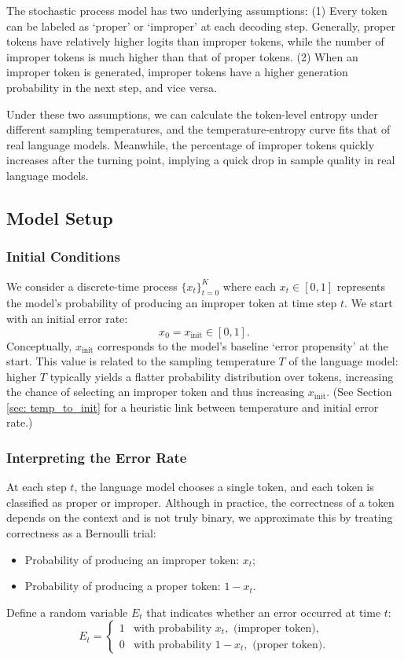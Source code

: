 The stochastic process model has two underlying assumptions: (1) Every token can be labeled as `proper' or `improper' at each decoding step. Generally, proper tokens have relatively higher logits than improper tokens, while the number of improper tokens is much higher than that of proper tokens. (2) When an improper token is generated, improper tokens have a higher generation probability in the next step, and vice versa.

Under these two assumptions, we can calculate the token-level entropy under different sampling temperatures, and the temperature-entropy curve fits that of real language models. Meanwhile, the percentage of improper tokens quickly increases after the turning point, implying a quick drop in sample quality in real language models.

\subsection{Model Setup}
\subsubsection{Initial Conditions}
We consider a discrete-time process \(\{x_t\}_{t=0}^{K}\) where each \(x_t \in [0,1]\) represents the model’s probability of producing an improper token at time step \(t\). We start with an initial error rate:
\[
x_0 = x_{\text{init}} \in [0,1].
\]
Conceptually, \(x_{\text{init}}\) corresponds to the model’s baseline `error propensity' at the start. This value is related to the sampling temperature \(T\) of the language model: higher \(T\) typically yields a flatter probability distribution over tokens, increasing the chance of selecting an improper token and thus increasing \(x_{\text{init}}\). (See Section \ref{sec: temp_to_init} for a heuristic link between temperature and initial error rate.)

\subsubsection{Interpreting the Error Rate}
At each step \(t\), the language model chooses a single token, and each token is classified as proper or improper. Although in practice, the correctness of a token depends on the context and is not truly binary, we approximate this by treating correctness as a Bernoulli trial:
\begin{itemize}
   \item Probability of producing an improper token: \(x_t\);
   \item Probability of producing a proper token: \(1 - x_t\).
\end{itemize}
Define a random variable \(E_t\) that indicates whether an error occurred at time \(t\):
   \[
   E_t = \begin{cases} 
   1 & \text{with probability } x_t, \text{ (improper token)},\\
   0 & \text{with probability } 1 - x_t, \text{ (proper token)}.
   \end{cases}
   \]

